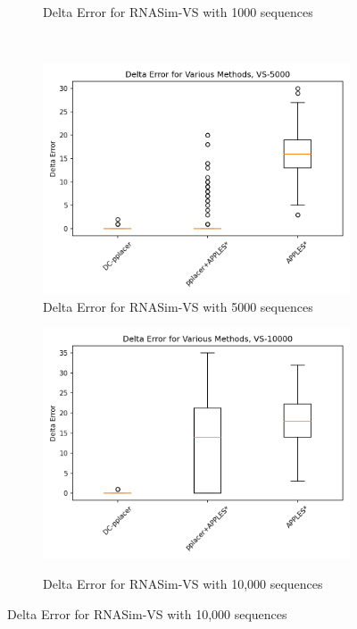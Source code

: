 \documentclass[10pt]{article}
\begin{document}
\begin{figure}[h]
\begin{subfigure}{0.5\textwidth}
\caption{Delta Error for RNASim-VS with 1000 sequences}
\label{fig:error1000}
\end{subfigure}\\
\begin{subfigure}{0.5\textwidth}
\centering
\includegraphics[width=\textwidth]{Figs/VS-delta-error-5000-BW.png}
\caption{Delta Error for RNASim-VS with 5000 sequences}
\label{fig:error5000}
\end{subfigure}
\begin{subfigure}{0.5\textwidth}
\centering
\includegraphics[width=\textwidth]{Figs/VS-delta-error-10000-BW.png}
\label{fig:error10000}
\caption{Delta Error for RNASim-VS with 10,000 sequences}
\end{subfigure}%
\end{figure}
\end{document}
